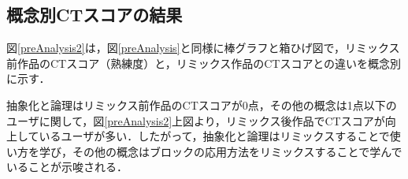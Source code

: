 \documentclass[submit,techrep,noauthor]{ipsj}
\newcommand{\todo}[1]{\colorbox{yellow}{{\bf TODO}:}{\color{red} {\textbf{[#1]}}}}
\newcommand{\memo}[1]{\colorbox{magenta!30}{\textbf{MEMO}}{\color{red!50}\textbf{[#1]}}}
\begin{document}




\subsection{概念別CTスコアの結果}

図\ref{preAnalysis2}は，図\ref{preAnalysis}と同様に棒グラフと箱ひげ図で，リミックス前作品のCTスコア（熟練度）と，リミックス作品のCTスコアとの違いを概念別に示す．




抽象化と論理はリミックス前作品のCTスコアが0点，その他の概念は1点以下のユーザに関して，図\ref{preAnalysis2}上図より，リミックス後作品でCTスコアが向上しているユーザが多い．したがって，抽象化と論理はリミックスすることで使い方を学び，その他の概念はブロックの応用方法をリミックスすることで学んでいることが示唆される．
\end{document}
